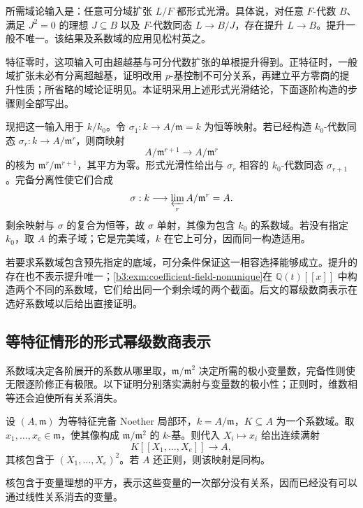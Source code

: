 \begin{proofsketch}
	所需域论输入是：任意可分域扩张 \(L/F\) 都形式光滑。具体说，对任意 \(F\)-代数 \(B\)、满足 \(J^2=0\) 的理想 \(J\subseteq B\) 以及 \(F\)-代数同态 \(L\to B/J\)，存在提升 \(L\to B\)。提升一般不唯一。该结果及系数域的应用见松村英之\cite[Theorem 26.9, pp. 204--205; Theorem 28.3, pp. 215--216]{Matsumura1989CommutativeRingTheory}。

	特征零时，这项输入可由超越基与可分代数扩张的单根提升得到。正特征时，一般域扩张未必有分离超越基，证明改用 \(p\)-基控制不可分关系，再建立平方零商的提升性质；所省略的域论证明见\cite[Theorems 26.7--26.9, pp. 203--205]{Matsumura1989CommutativeRingTheory}。本证明采用上述形式光滑结论，下面逐阶构造的步骤则全部写出。

	现把这一输入用于 \(k/k_0\)。令 \(\sigma_1:k\to A/\mathfrak m=k\) 为恒等映射。若已经构造 \(k_0\)-代数同态 \(\sigma_r:k\to A/\mathfrak m^r\)，则商映射
	\[
		A/\mathfrak m^{r+1}\longrightarrow A/\mathfrak m^r
	\]
	的核为 \(\mathfrak m^r/\mathfrak m^{r+1}\)，其平方为零。形式光滑性给出与 \(\sigma_r\) 相容的 \(k_0\)-代数同态 \(\sigma_{r+1}\)。完备分离性使它们合成
	\[
		\sigma:k\longrightarrow\varprojlim_r A/\mathfrak m^r=A.
	\]
	剩余映射与 \(\sigma\) 的复合为恒等，故 \(\sigma\) 单射，其像为包含 \(k_0\) 的系数域。若没有指定 \(k_0\)，取 \(A\) 的素子域；它是完美域，\(k\) 在它上可分，因而同一构造适用。
\end{proofsketch}

若要求系数域包含预先指定的底域，可分条件保证这一相容选择能够成立。提升的存在也不表示提升唯一；\cref{b3:exm:coefficient-field-nonunique}在 \(\mathbb Q(t)[\![x]\!]\) 中构造两个不同的系数域，它们给出同一个剩余域的两个截面。后文的幂级数商表示在选好系数域以后给出直接证明。

\subsection{等特征情形的形式幂级数商表示}
\label{b3:subsec:D02:02}

系数域决定各阶展开的系数从哪里取，\(\mathfrak m/\mathfrak m^2\) 决定所需的极小变量数，完备性则使无限逐阶修正有极限。以下证明分别落实满射与变量数的极小性；正则时，维数相等还会迫使所有关系消失。

\begin{theorem}\label{b3:thm:equicharacteristic-power-series-cover}
	设 \((A,\mathfrak m)\) 为等特征完备 Noether 局部环，\(k=A/\mathfrak m\)，\(K\subseteq A\) 为一个系数域。取 \(x_1,\ldots,x_e\in\mathfrak m\)，使其像构成 \(\mathfrak m/\mathfrak m^2\) 的 \(k\)-基。则代入 \(X_i\mapsto x_i\) 给出连续满射
	\[
		K[\![X_1,\ldots,X_e]\!]\longrightarrow A,
	\]
	其核包含于 \((X_1,\ldots,X_e)^2\)。若 \(A\) 还正则，则该映射是同构。
\end{theorem}
核包含于变量理想的平方，表示这些变量的一次部分没有关系，因而已经没有可以通过线性关系消去的变量。


